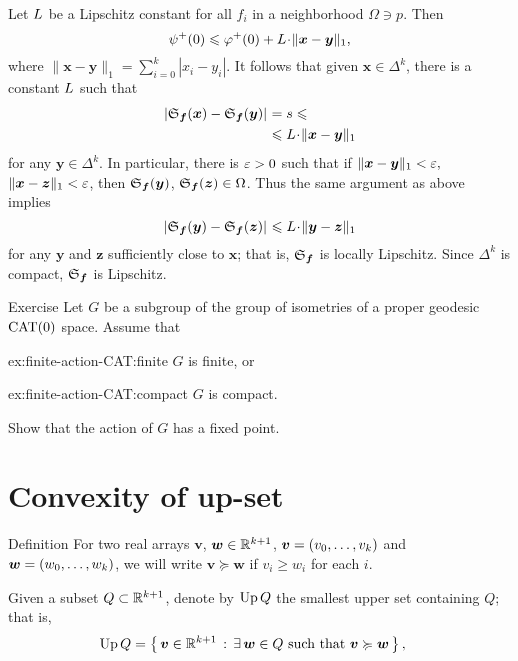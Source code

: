 Let $L$ be a Lipschitz constant for all $f_i$ in a neighborhood $\Omega\ni p$.
Then 
\[\psi^+(0)
\le 
\phi^+(0)+\Lip\cdot\|\bm{x}-\bm{y}\|_1,\] 
where $\|\bm{x}-\bm{y}\|_1=\sum_{i=0}^k|x_i-y_i|$.
It follows that given $\bm{x}\in\Delta^k$, there is a constant $L$ such that
\begin{align*}
\dist{\spx{\bm{f}}(\bm{x})}{\spx{\bm{f}}(\bm{y})}{}
&=
s
\le
\\
&\le 
\Lip\cdot\|\bm{x}-\bm{y}\|_1
\end{align*}
for any $\bm{y}\in\Delta^k$.
In particular, there is $\varepsilon>0$ such that if $\|\bm{x}-\bm{y}\|_1<\varepsilon,$ $\|\bm{x}-\bm{z}\|_1 <\varepsilon$, then $\mathfrak{S}_{\bm{f}}(\bm{y})$, $\mathfrak{S}_{\bm{f}}(\bm{z})\in\Omega$. 
Thus the same argument as above implies 
\[\dist{\spx{\bm{f}}(\bm{y})}{\spx{\bm{f}}(\bm{z})}{}
\le \Lip\cdot\|\bm{y}-\bm{z}\|_1\]
for any $\bm{y}$ and $\bm{z}$ sufficiently close to $\bm{x}$; that is, $\mathfrak{S}_{\bm{f}}$ is locally Lipschitz.
Since $\Delta^k$ is compact, $\mathfrak{S}_{\bm{f}}$ is Lipschitz.
\qeds

\begin{thm}{Exercise}\label{ex:finite-action-CAT}
Let $G$ be a subgroup of the group of isometries of a proper geodesic $\mathrm{CAT}(0)$ space.
Assume that
\begin{subthm}{ex:finite-action-CAT:finite}
$G$ is finite, or
\end{subthm}
\begin{subthm}{ex:finite-action-CAT:compact}
 $G$ is compact.
\end{subthm}
Show that the action of $G$ has a fixed point.
\end{thm}

\section{Convexity of up-set}

\begin{thm}{Definition}\label{def:ordung}
For two real arrays $\bm{v}$, $\bm{w}\in \mathbb{R}^{k+1}$,
$\bm{v}=(v_0,\z\dots,v_\kay)$ 
and 
$\bm{w}=(w_0,\z\dots,w_\kay)$, 
we will write
$\bm{v}\succcurlyeq\bm{w}$ if $v_i\ge w_i$ for each $i$.
\end{thm}

Given a subset $Q\subset \mathbb{R}^{k+1}$, 
denote by $\mathop{\rm Up}\nolimits Q$ \label{PAGE.def:Up}
the smallest upper set containing $Q$;
that is,
\begin{align*}
\Up Q 
&=
\set{\bm{v}\in\RR^{\kay+1}}{\exists\, \bm{w}\in Q\ \text{such that}\ \bm{v}\succcurlyeq\bm{w}},
\end{align*}

